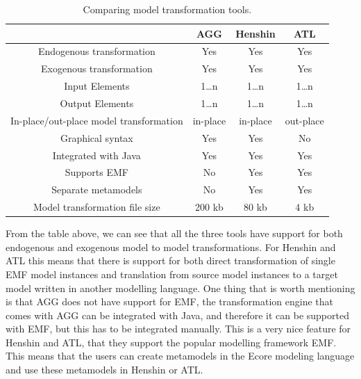 \documentclass[pdftex,11pt,a4paper]{article}
\begin{document}
\begin{table}[ht]
\centering
\begin{tabular}{| c | c | c | c |}
\hline
 & AGG & Henshin & ATL \\
\hline
Endogenous transformation & \cellcolor{green!25}Yes &
\cellcolor{green!25}Yes & \cellcolor{green!25}Yes \\

Exogenous transformation & \cellcolor{green!25}Yes &
\cellcolor{green!25}Yes & \cellcolor{green!25}Yes \\

Input Elements & 1\ldots n & 1\ldots n & 1\ldots n\\
Output Elements & 1\ldots n & 1\ldots n & 1\ldots n\\
In-place/out-place model transformation &in-place &
in-place &out-place \\
Graphical syntax &\cellcolor{green!25}Yes &
\cellcolor{green!25}Yes &\cellcolor{red!25}No  \\
Integrated with Java & \cellcolor{green!25}Yes &
\cellcolor{green!25}Yes & \cellcolor{green!25}Yes \\
Supports EMF & \cellcolor{red!25}No &
\cellcolor{green!25}Yes & \cellcolor{green!25}Yes \\
Separate metamodels & \cellcolor{red!25}No &
\cellcolor{green!25}Yes & \cellcolor{green!25}Yes \\
Model transformation file size &200 kb &80 kb &4 kb \\
\hline

\end{tabular}
\caption{Comparing model transformation tools.}
\end{table}

From the table above, we can see that all the three tools have support for both
endogenous and exogenous model to model transformations. For Henshin and ATL
this means that there is support for both direct transformation of single EMF
model instances and translation from source model instances to a target model
written in another modelling language. One thing that is worth mentioning is
that AGG does not have support for EMF, the transformation engine that comes
with AGG can be integrated with Java, and therefore it can be supported with
EMF, but this has to be integrated manually. This is a very nice feature for
Henshin and ATL, that they support the popular modelling framework EMF. This
means that the users can create metamodels in the Ecore modeling language and
use these metamodels in Henshin or ATL. 
\end{document}

